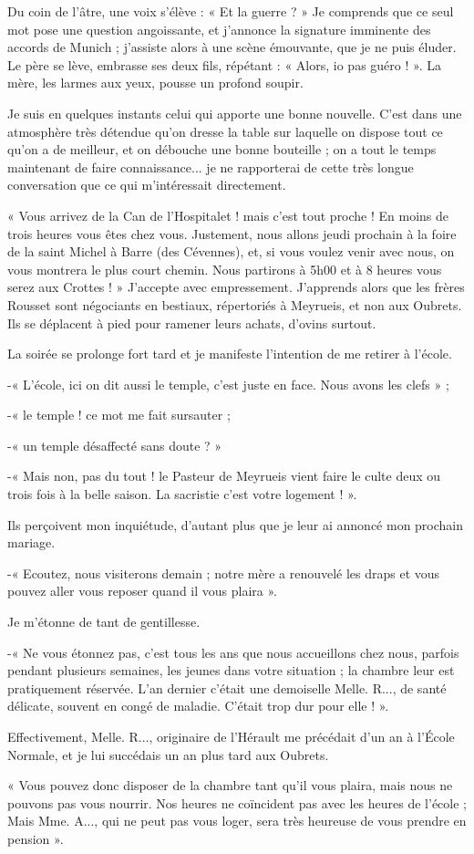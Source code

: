 
Du coin de l'âtre, une voix s'élève : « Et la guerre ? » Je comprends que ce seul mot
pose une question angoissante, et j'annonce la signature imminente des accords de
Munich ; j'assiste alors à une scène émouvante, que je ne puis éluder. Le père se lève,
embrasse ses deux fils, répétant : « Alors, io pas guéro ! ». La mère, les larmes aux
yeux, pousse un profond soupir.

Je suis en quelques instants celui qui apporte une bonne nouvelle. C'est dans une
atmosphère très détendue qu'on dresse la table sur laquelle on dispose tout ce qu'on a
de meilleur, et on débouche une bonne bouteille ; on a tout le temps maintenant de
faire connaissance... je ne rapporterai de cette très longue conversation que ce qui
m'intéressait directement.

« Vous arrivez de la Can de l'Hospitalet ! mais c'est tout proche ! En moins de trois
heures vous êtes chez vous. Justement, nous allons jeudi prochain à la foire de la saint
Michel à Barre (des Cévennes), et, si vous voulez venir avec nous, on vous montrera
le plus court chemin. Nous partirons à 5h00 et à 8 heures vous serez aux Crottes ! »
J'accepte avec empressement. J'apprends alors que les frères Rousset sont négociants
en bestiaux, répertoriés à Meyrueis, et non aux Oubrets. Ils se déplacent à pied pour
ramener leurs achats, d'ovins surtout.

La soirée se prolonge fort tard et je manifeste l'intention de me retirer à l'école.

-« L'école, ici on dit aussi le temple, c'est juste en face. Nous avons les clefs » ;

-« le temple ! ce mot me fait sursauter ;

-« un temple désaffecté sans doute ? »

-« Mais non, pas du tout ! le Pasteur de Meyrueis vient faire le culte deux ou trois
fois à la belle saison. La sacristie c'est votre logement ! ».

Ils perçoivent mon inquiétude, d'autant plus que je leur ai annoncé mon prochain
mariage.

-« Ecoutez, nous visiterons demain ; notre mère a renouvelé les draps et vous
pouvez aller vous reposer quand il vous plaira ».

Je m'étonne de tant de gentillesse.

-« Ne vous étonnez pas, c'est tous les ans que nous accueillons chez nous, parfois
pendant plusieurs semaines, les jeunes dans votre situation ; la chambre leur est
pratiquement réservée. L'an dernier c'était une demoiselle Melle. R..., de santé
délicate, souvent en congé de maladie. C'était trop dur pour elle ! ».

Effectivement, Melle. R..., originaire de l'Hérault me précédait d'un an à l'École
Normale, et je lui succédais un an plus tard aux Oubrets.

« Vous pouvez donc disposer de la chambre tant qu'il vous plaira, mais nous ne
pouvons pas vous nourrir. Nos heures ne coïncident pas avec les heures de l'école ;
Mais Mme. A..., qui ne peut pas vous loger, sera très heureuse de vous prendre en
pension ».
